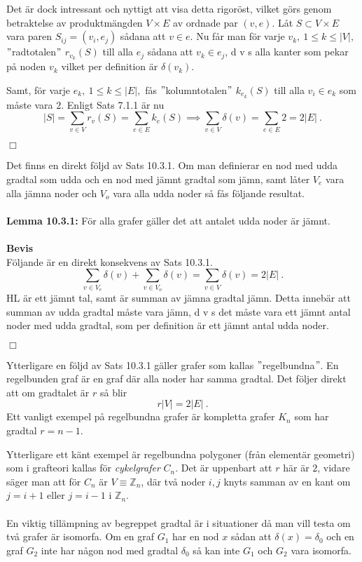 \documentclass{article}
\begin{document}
Det är dock intressant och nyttigt att visa detta rigoröst, vilket görs genom betraktelse av produktmängden $V\times E$ av ordnade par $(v,e)$. Låt $S\subset V\times E$ vara paren $S_{ij}=(v_i,e_j)$ sådana att $v\in e$. Nu får man för varje $v_k, \ 1\leq k\leq|V|,$ $"$radtotalen$"$ $r_{v_k}(S)$ till alla $e_j$ sådana att $v_k\in e_j$, d v s alla kanter som pekar på noden $v_k$ vilket per definition är $\delta(v_k)$.

Samt, för varje $e_k, \ 1\leq k\leq|E|,$ fås $"$kolumntotalen$"$ $k_{e_k}(S)$ till alla $v_i\in e_k$ som måste vara $2$. Enligt Sats 7.1.1 är nu
$$
|S|=\sum_{v\in V}r_v(S)=\sum_{e\in E}k_e(S)\implies \sum_{v\in V}\delta(v)=\sum_{e\in E}2=2|E| \ .
$$
\begin{flushright}
$\Box$
\end{flushright}
Det finns en direkt följd av Sats 10.3.1. Om man definierar en nod med udda gradtal som udda och en nod med jämnt gradtal som jämn, samt låter $V_e$ vara alla jämna noder och $V_o$ vara alla udda noder så fås följande resultat.\\ \\
\textbf{Lemma 10.3.1:} För alla grafer gäller det att antalet udda noder är jämnt.\\ \\
\textbf{Bevis}\\
Följande är en direkt konsekvens av Sats 10.3.1.
$$
\sum_{v\in V_e}\delta(v)+\sum_{v\in V_o}\delta(v)=\sum_{v\in V}\delta(v)=2|E| \ .
$$
HL är ett jämnt tal, samt är summan av jämna gradtal jämn. Detta innebär att summan av udda gradtal måste vara jämn, d v s det måste vara ett jämnt antal noder med udda gradtal, som per definition är ett jämnt antal udda noder.
\begin{flushright}
$\Box$
\end{flushright}
Ytterligare en följd av Sats 10.3.1 gäller grafer som kallas $"$regelbundna$"$. En regelbunden graf är en graf där alla noder har samma gradtal. Det följer direkt att om gradtalet är $r$ så blir
$$
r|V|=2|E| \ .
$$
Ett vanligt exempel på regelbundna grafer är kompletta grafer $K_n$ som har gradtal $r=n-1$.

Ytterligare ett känt exempel är regelbundna polygoner (från elementär geometri) som i grafteori kallas för \textit{cykelgrafer} $C_n$. Det är uppenbart att $r$ här är $2$, vidare säger man att för $C_n$ är $V\equiv\mathbb{Z}_n$, där två noder $i,j$ knyts samman av en kant om $j=i+1$ eller $j=i-1$ i $\mathbb{Z}_n$.\\ \\
En viktig tillämpning av begreppet gradtal är i situationer då man vill testa om två grafer är isomorfa. Om en graf $G_1$ har en nod $x$ sådan att $\delta(x)=\delta_0$ och en graf $G_2$ inte har någon nod med gradtal $\delta_0$ så kan inte $G_1$ och $G_2$ vara isomorfa.
\end{document}
